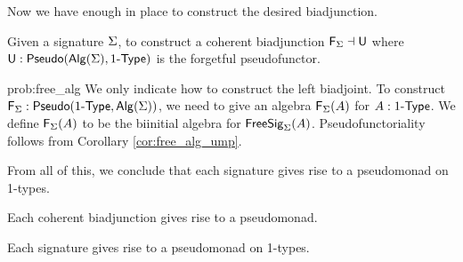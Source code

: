 Now we have enough in place to construct the desired biadjunction.

\begin{problem}
\label{prob:free_alg}
Given a signature $\Sigma$, to construct a coherent biadjunction $\mathsf{F}_{\Sigma} \dashv \mathsf{U}$ where $\mathsf{U} : \mathsf{Pseudo}(\mathsf{Alg}(\Sigma), 1\mbox{-}\mathsf{Type})$ is the forgetful pseudofunctor.
\end{problem}

\begin{construction}{prob:free_alg}
We only indicate how to construct the left biadjoint.
To construct $\mathsf{F}_{\Sigma} : \mathsf{Pseudo}(1\mbox{-}\mathsf{Type}, \mathsf{Alg}(\Sigma))$, we need to give an algebra $\mathsf{F}_{\Sigma}(A)$ for $A : 1\mbox{-}\mathsf{Type}$.
We define $\mathsf{F}_{\Sigma}(A)$ to be the biinitial algebra for $\mathsf{FreeSig}_{\Sigma}(A)$.
Pseudofunctoriality follows from Corollary \ref{cor:free_alg_ump}.
\end{construction}

From all of this, we conclude that each signature gives rise to a pseudomonad on 1-types.

\begin{proposition}
Each coherent biadjunction gives rise to a pseudomonad.
\end{proposition}

\begin{corollary}
\label{cor:pseudomonadofsig}
Each signature gives rise to a pseudomonad on 1-types.
\end{corollary}
